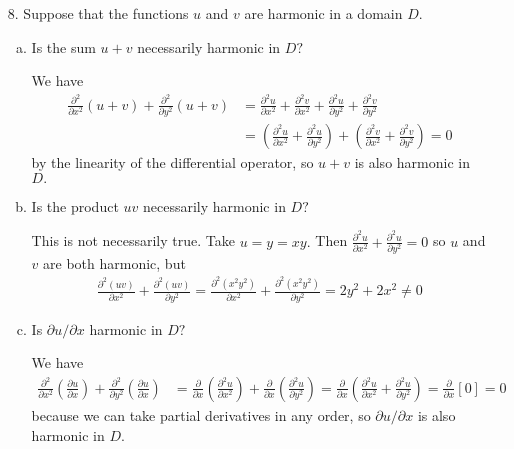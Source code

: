 \documentclass{article}
\begin{document}
\begin{itemize}
	\item[8.] Suppose that the functions $u$ and $v$ are harmonic in a domain $D.$
		\begin{enumerate}[(a)]
			\item Is the sum $u+v$ necessarily harmonic in $D?$
				\begin{soln}
					We have
					\begin{align*}
						\frac{\partial^2}{\partial x^2}(u+v) + \frac{\partial^2}{\partial y^2}(u+v) &= \frac{\partial^2u}{\partial x^2} + \frac{\partial^2v}{\partial x^2} + \frac{\partial^2u}{\partial y^2} + \frac{\partial^2 v}{\partial y^2} \\
						&= \left( \frac{\partial^2u}{\partial x^2} + \frac{\partial^2u}{\partial y^2} \right) + \left( \frac{\partial^2 v}{\partial x^2} + \frac{\partial^2v}{\partial y^2} \right) = 0
					\end{align*}
					by the linearity of the differential operator, so $u+v$ is also harmonic in $D.$
				\end{soln}

			\item Is the product $uv$ necessarily harmonic in $D?$
				\begin{soln}
					This is not necessarily true. Take $u=y=xy.$ Then $\frac{\partial^2u}{\partial x^2}+\frac{\partial^2u}{\partial y^2} = 0$ so $u$ and $v$ are both harmonic, but
					\begin{align*}
						\frac{\partial^2(uv)}{\partial x^2} + \frac{\partial^2 (uv)}{\partial y^2} = \frac{\partial^2 (x^2y^2)}{\partial x^2} + \frac{\partial^2 (x^2y^2)}{\partial y^2} = 2y^2 + 2x^2\neq 0
					\end{align*}
				\end{soln}

			\item Is $\partial u/\partial x$ harmonic in $D?$
				\begin{soln}
					We have
					\begin{align*}
						\frac{\partial^2}{\partial x^2} \left( \frac{\partial u}{\partial x} \right) + \frac{\partial^2}{\partial y^2} \left( \frac{\partial u}{\partial x} \right) &= \frac{\partial}{\partial x} \left( \frac{\partial^2u}{\partial x^2} \right) + \frac{\partial}{\partial x} \left( \frac{\partial^2u}{\partial y^2} \right) = \frac{\partial}{\partial x} \left( \frac{\partial^2u}{\partial x^2} + \frac{\partial^2 u}{\partial y^2} \right) = \frac{\partial}{\partial x} [0] = 0
					\end{align*}
					because we can take partial derivatives in any order, so $\partial u/\partial x$ is also harmonic in $D.$
				\end{soln}


\end{enumerate}
\end{itemize}
\end{document}
